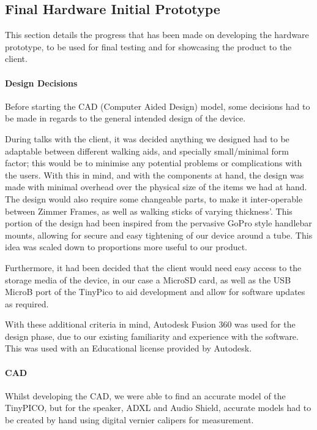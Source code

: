 {\subsection{Final Hardware Initial Prototype}
\label{sec:cad}

This section details the progress that has been made on developing the hardware prototype, to be used for final testing and for showcasing the product to the client.

\paragraph{Design Decisions}

Before starting the CAD (Computer Aided Design) model, some decisions had to be made in regards to the general intended design of the device.

During talks with the client, it was decided anything we designed had to be adaptable between different walking aids, and specially small/minimal form factor; this would be to minimise any potential problems or complications with the users. With this in mind, and with the components at hand, the design was made with minimal overhead over the physical size of the items we had at hand. The design would also require some changeable parts, to make it inter-operable between Zimmer Frames, as well as walking sticks of varying thickness'. This portion of the design had been inspired from the pervasive GoPro style handlebar mounts, allowing for secure and easy tightening of our device around a tube. This idea was scaled down to proportions more useful to our product.

Furthermore, it had been decided that the client would need easy access to the storage media of the device, in our case a MicroSD card, as well as the USB MicroB port of the TinyPico to aid development and allow for software updates as required.

With these additional criteria in mind, Autodesk Fusion 360 was used for the design phase, due to our existing  familiarity and experience with the software. This was used with an Educational license provided by Autodesk.

\paragraph{CAD}

Whilst developing the CAD, we were able to find an accurate model of the TinyPICO, but for the speaker, ADXL and Audio Shield, accurate models had to be created by hand using digital vernier calipers for measurement. 

}

